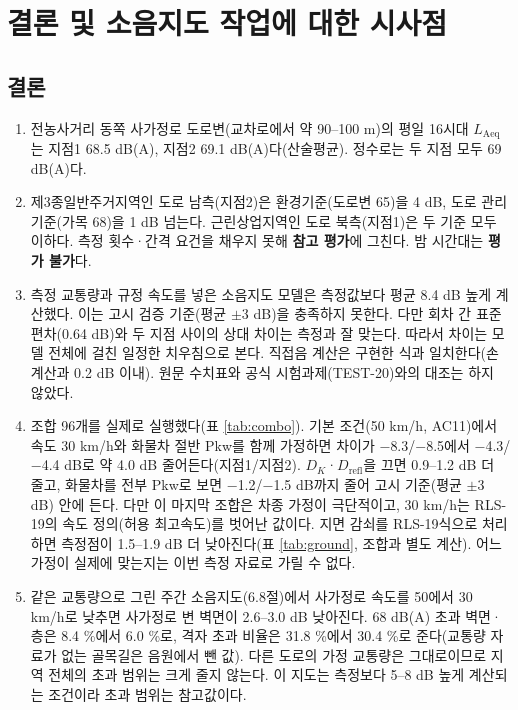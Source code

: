 \documentclass[10.5pt,a4paper]{article}
\newcommand{\Laeq}{\ensuremath{L_{\mathrm{Aeq}}}}
\begin{document}
\addtocounter{table}{-1}
\normalsize

\section{결론 및 소음지도 작업에 대한 시사점}
\subsection{결론}
\begin{enumerate}
\item 전농사거리 동쪽 사가정로 도로변(교차로에서 약 90--100 m)의 평일 16시대 \Laeq 는 지점1 68.5 dB(A), 지점2 69.1 dB(A)다(산술평균). 정수로는 두 지점 모두 69 dB(A)다.
\item 제3종일반주거지역인 도로 남측(지점2)은 환경기준(도로변 65)을 4 dB, 도로 관리기준(가목 68)을 1 dB 넘는다. 근린상업지역인 도로 북측(지점1)은 두 기준 모두 이하다. 측정 횟수·간격 요건을 채우지 못해 \textbf{참고 평가}에 그친다. 밤 시간대는 \textbf{평가 불가}다.
\item 측정 교통량과 규정 속도를 넣은 소음지도 모델은 측정값보다 평균 8.4 dB 높게 계산했다. 이는 고시 검증 기준(평균 $\pm$3 dB)을 충족하지 못한다. 다만 회차 간 표준편차(0.64 dB)와 두 지점 사이의 상대 차이는 측정과 잘 맞는다. 따라서 차이는 모델 전체에 걸친 일정한 치우침으로 본다. 직접음 계산은 구현한 식과 일치한다(손계산과 0.2 dB 이내). 원문 수치표와 공식 시험과제(TEST-20)와의 대조는 하지 않았다.
\item 조합 96개를 실제로 실행했다(표 \ref{tab:combo}). 기본 조건(50 km/h, AC11)에서 속도 30 km/h와 화물차 절반 Pkw를 함께 가정하면 차이가 $-$8.3/$-$8.5에서 $-$4.3/$-$4.4 dB로 약 4.0 dB 줄어든다(지점1/지점2). $D_K$·$D_{\mathrm{refl}}$을 끄면 0.9--1.2 dB 더 줄고, 화물차를 전부 Pkw로 보면 $-$1.2/$-$1.5 dB까지 줄어 고시 기준(평균 $\pm$3 dB) 안에 든다. 다만 이 마지막 조합은 차종 가정이 극단적이고, 30 km/h는 RLS-19의 속도 정의(허용 최고속도)를 벗어난 값이다. 지면 감쇠를 RLS-19식으로 처리하면 측정점이 1.5--1.9 dB 더 낮아진다(표 \ref{tab:ground}, 조합과 별도 계산). 어느 가정이 실제에 맞는지는 이번 측정 자료로 가릴 수 없다.
\item 같은 교통량으로 그린 주간 소음지도(6.8절)에서 사가정로 속도를 50에서 30 km/h로 낮추면 사가정로 변 벽면이 2.6--3.0 dB 낮아진다. 68 dB(A) 초과 벽면·층은 8.4 \%에서 6.0 \%로, 격자 초과 비율은 31.8 \%에서 30.4 \%로 준다(교통량 자료가 없는 골목길은 음원에서 뺀 값). 다른 도로의 가정 교통량은 그대로이므로 지역 전체의 초과 범위는 크게 줄지 않는다. 이 지도는 측정보다 5--8 dB 높게 계산되는 조건이라 초과 범위는 참고값이다.
\end{enumerate}
\end{document}
